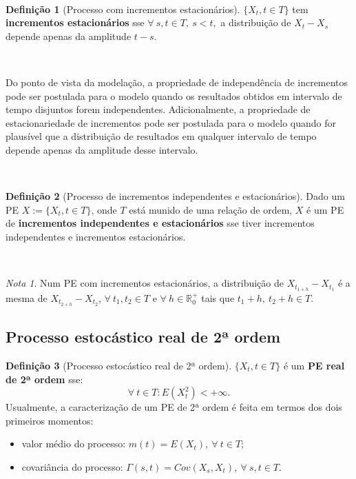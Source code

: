 \documentclass[
  11pt,
  a4paper,
]{book}
\providecommand{\tightlist}{%
  \setlength{\itemsep}{0pt}\setlength{\parskip}{0pt}}
\theoremstyle{definition}
\newtheorem{definition}{Definição}[chapter]
\theoremstyle{definition}
\theoremstyle{definition}
\theoremstyle{definition}
\theoremstyle{remark}
\newtheorem*{remark}{Nota }
\begin{document}
\(\,\)

\begin{definition}[Processo com incrementos estacionários]
\(\{X_t, t \in T\}\) tem \textbf{incrementos estacionários} sse \(\forall ~s, t \in T, ~s<t,\) a
distribuição de \(X_t-X_s\) depende apenas da amplitude \(t-s\).
\end{definition}

\(\,\)

Do ponto de vista da modelação, a propriedade de independência de incrementos pode ser
postulada para o modelo quando os resultados obtidos em intervalo de tempo disjuntos forem
independentes. Adicionalmente, a propriedade de estacionariedade de incrementos pode ser
postulada para o modelo quando for plausível que a distribuição de resultados em qualquer
intervalo de tempo depende apenas da amplitude desse intervalo.

\(\,\)

\begin{definition}[Processo de incrementos independentes e estacionários]
Dado um PE \(X:=\{X_t, t \in T\}\), onde \(T\) está munido de uma relação de ordem, \(X\) é um PE
de \textbf{incrementos independentes e estacionários} sse tiver incrementos independentes e
incrementos estacionários.
\end{definition}

\(\,\)

\begin{remark}
Num PE com incrementos estacionários, a distribuição de \(X_{t_{1+h}}-X_{t_1}\) é a mesma de
\(X_{t_{2+h}}-X_{t_2}\), \(\forall ~ t_1,t_2 \in T\) e \(\forall ~ h \in \mathbb{R}_0^+\) tais que \(t_1+h, ~t_2+h \in T.\)
\end{remark}

\subsection{Processo estocástico real de 2ª ordem}\label{processo-estocuxe1stico-real-de-2uxaa-ordem}

\begin{definition}[Processo estocástico real de 2ª ordem]

\(\{X_t, t \in T\}\) é um \textbf{PE real de 2ª ordem} sse: \[\forall ~t \in T: E(X_t^2)<+\infty.\]
Usualmente, a caracterização de um PE de 2ª ordem é feita em termos dos dois primeiros
momentos:

\begin{itemize}
\tightlist
\item
  valor médio do processo: \(m(t)=E(X_t), ~\forall ~t \in T\);\\
\item
  covariância do processo: \(\Gamma(s,t)=Cov(X_s,X_t), ~\forall ~s,t \in T\).
\end{itemize}

\end{definition}
\end{document}

